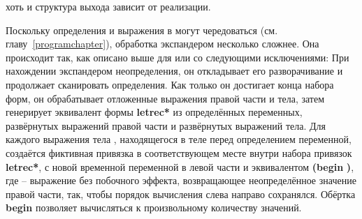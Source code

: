 хоть и структура выхода зависит от реализации.\vspace{2.4mm}

Поскольку определения и выражения в  могут чередоваться
(см. главу~\ref{programchapter}), обработка экспандером  несколько
сложнее. Она происходит так, как описано выше для  или  со
следующими исключениями: При нахождении экспандером неопределения, он откладывает его
разворачивание и продолжает сканировать определения. Как только он достигает конца набора форм,
он обрабатывает отложенные выражения правой части и тела, затем генерирует эквивалент формы
{\cf\bfseries letrec*} из определённых переменных, развёрнутых выражений правой части и
развёрнутых выражений тела. Для каждого выражения тела , находящегося в теле
перед определением переменной, создаётся фиктивная привязка в соответствующем месте внутри
набора привязок {\cf\bfseries letrec*}, с новой временной переменной в левой части и
эквивалентом {\cf \textbf{(begin}  \textbf{)}}, где
 -- выражение без побочного эффекта, возвращающее неопределённое значение
правой части, так, чтобы порядок вычисления слева направо сохранялся. Обёртка {\cf\bfseries
  begin} позволяет  вычисляться к произвольному количеству значений.

